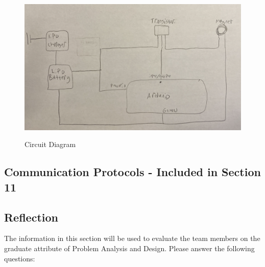 \documentclass[12pt, titlepage]{article}
\begin{document}
 
  \begin{figure}[ht]
 \begin{center}
 {
  \includegraphics[width=0.5\linewidth]{10.png}
 }
 \caption{\label{Circuit Diagram} Circuit Diagram}
 \end{center}
 \end{figure}
 
 \newpage
    
 \newpage
 
\subsection{Communication Protocols - Included in Section 11}



\subsection{Reflection}

The information in this section will be used to evaluate the team members on the
graduate attribute of Problem Analysis and Design.  Please answer the following questions:
\end{document}
